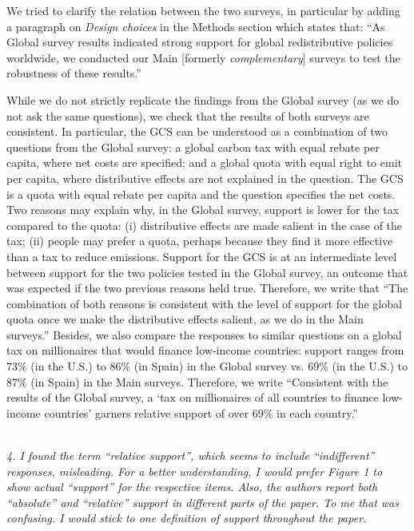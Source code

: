\documentclass[12pt,english]{article}
\begin{document}
We tried to clarify the relation between the two surveys, in particular by adding a paragraph on \textit{Design choices} in the Methods section which states that: ``As Global survey results indicated strong support for global redistributive policies worldwide, we conducted our Main [formerly \textit{complementary}] surveys to test the robustness of these results.'' 

While we do not strictly replicate the findings from the Global survey (as we do not ask the same questions), we check that the results of both surveys are consistent. In particular, the GCS can be understood as a combination of two questions from the Global survey: a global carbon tax with equal rebate per capita, where net costs are specified; and a global quota with equal right to emit per capita, where distributive effects are not explained in the question. The GCS is a quota with equal rebate per capita and the question specifies the net costs. Two reasons may explain why, in the Global survey, support is lower for the tax compared to the quota: (i) distributive effects are made salient in the case of the tax; (ii) people may prefer a quota, perhaps because they find it more effective than a tax to reduce emissions. Support for the GCS is at an intermediate level between support for the two policies tested in the Global survey, an outcome that was expected if the two previous reasons held true. Therefore, we write that ``The combination of both reasons is consistent with the level of support for the global quota once we make the distributive effects salient, as we do in the Main surveys.'' Besides, we also compare the responses to similar questions on a global tax on millionaires that would finance low-income countries: support ranges from 73\% (in the U.S.) to 86\% (in Spain) in the Global survey vs. 69\% (in the U.S.) to 87\% (in Spain) in the Main surveys. Therefore, we write ``Consistent with the results of the Global survey, a `tax on millionaires of all countries to finance low-income countries' garners relative support of over 69\% in each country.''

~\\

\textit{4. I found the term “relative support”, which seems to include “indifferent” responses, misleading. For a better understanding, I would prefer Figure 1 to show actual “support” for the respective items. Also, the authors report both “absolute” and “relative” support in different parts of the paper. To me that was confusing. I would stick to one definition of support throughout the paper.}
\end{document}
